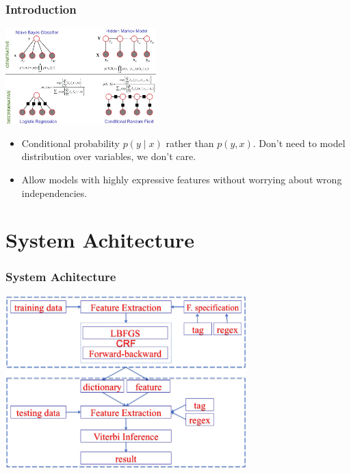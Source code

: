 \documentclass{beamer}
\begin{document}
\begin{frame}
  \frametitle{Introduction}
  \begin{center}
  \includegraphics[height=10em]{models.jpg}\\
  \end{center}
  \begin{itemize}
    \item Conditional probability $p(y \mid x)$ rather than $p(y,x)$. Don't need to model distribution over variables, we don't care.
    \item Allow models with highly expressive features without worrying about wrong independencies.
  \end{itemize}
\end{frame}

\section{System Achitecture}

\begin{frame}
  \frametitle{System Achitecture}
  \begin{center}
  \includegraphics[height=18em]{system.png}
  \end{center}
\end{frame}
\end{document}
